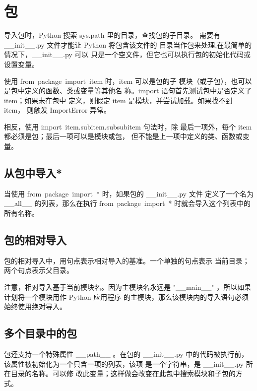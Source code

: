 \documentclass[a4paper, 12pt]{article}
\begin{document}
\section{包}
导入包时，Python 搜索 sys.path 里的目录，查找包的子目录。
需要有 \_\_init\_\_.py 文件才能让 Python 将包含该文件的
目录当作包来处理,在最简单的情况下，\_\_init\_\_.py 可以
只是一个空文件，但它也可以执行包的初始化代码或设置变量。\par
使用 from\ package\ import\ item 时，item 可以是包的子
模块（或子包），也可以是包中定义的函数、类或变量等其他名
称。import 语句首先测试包中是否定义了 item；如果未在包中
定义，则假定 item 是模块，并尝试加载。如果找不到 item，
则触发 ImportError 异常。\par
相反，使用 import\ item.subitem.subsubitem 句法时，除
最后一项外，每个 item 都必须是包；最后一项可以是模块或包，
但不能是上一项中定义的类、函数或变量。\par
\subsection{从包中导入*}
当使用 from\ package\ import\ * 时，如果包的 \_\_init\_\_.py 文件
定义了一个名为 \_\_all\_\_ 的列表，那么在执行 from\ package\ import\ *
时就会导入这个列表中的所有名称。\par
\subsection{包的相对导入}
包的相对导入中，用句点表示相对导入的基准。一个单独的句点表示
当前目录；两个句点表示父目录。\par
注意，相对导入基于当前模块名。因为主模块名永远是 
"\_\_main\_\_" ，所以如果计划将一个模块用作 Python 应用程序
的主模块，那么该模块内的导入语句必须始终使用绝对导入。\par
\subsection{多个目录中的包}
包还支持一个特殊属性 \_\_path\_\_ 。在包的 \_\_init\_\_.py 
中的代码被执行前，该属性被初始化为一个只含一项的列表，该项
是一个字符串，是 \_\_init\_\_.py 所在目录的名称。可以修
改此变量；这样做会改变在此包中搜索模块和子包的方式。\par
\end{document}
